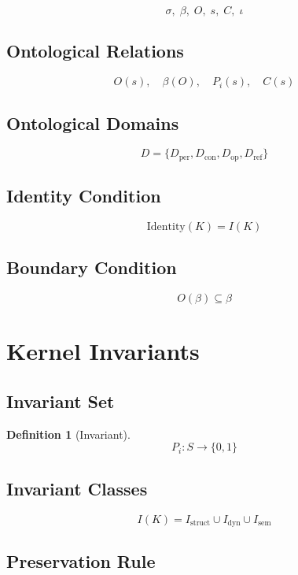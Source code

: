 \documentclass[12pt]{article}
\newtheorem{definition}{Definition}[section]
\begin{document}
\[
\sigma,\; \beta,\; O,\; s,\; C,\; \iota
\]

\subsection{Ontological Relations}

\[
O(s), \quad \beta(O), \quad P_i(s), \quad C(s)
\]

\subsection{Ontological Domains}

\[
D = \{D_{\mathrm{per}}, D_{\mathrm{con}}, D_{\mathrm{op}}, D_{\mathrm{ref}}\}
\]

\subsection{Identity Condition}

\[
\mathrm{Identity}(K) = I(K)
\]

\subsection{Boundary Condition}

\[
O(\beta) \subseteq \beta
\]

\section{Kernel Invariants}

\subsection{Invariant Set}

\begin{definition}[Invariant]
\[
P_i : S \to \{0,1\}
\]
\end{definition}

\subsection{Invariant Classes}

\[
I(K) = I_{\mathrm{struct}} \cup I_{\mathrm{dyn}} \cup I_{\mathrm{sem}}
\]

\subsection{Preservation Rule}
\end{document}
